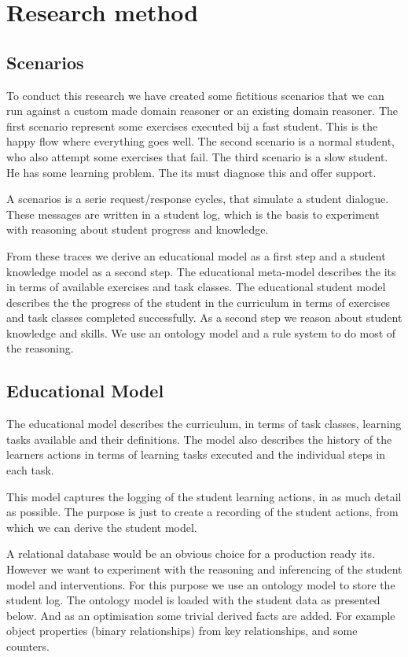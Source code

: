 \chapter{Research method}

\section{Scenarios}


To conduct this research we have created some fictitious scenarios that we can run against a custom made domain reasoner or an existing domain reasoner.
The first scenario represent some exercises executed bij a fast student. 
This is the happy flow where everything goes well.
The second scenario is a normal student, who also attempt some exercises that fail.
The third scenario is a slow student. 
He has some learning problem. 
The \gls{its} must diagnose this and offer support. 


A scenarios is a serie request/response cycles, that simulate a student dialogue.
These messages are written in a student log, which is the basis to experiment with reasoning about student progress and knowledge.

From these traces we derive an educational model as a first step and a student knowledge model as a second step.
The educational meta-model describes the \gls{its} in terms of available exercises and task classes.
The educational student model describes the the progress of the student in the curriculum in terms of exercises and task classes completed successfully.
As a second step we reason about student knowledge and skills.
We use an ontology model and a rule system to do most of the reasoning.


\section{Educational Model}

The educational model describes the curriculum, in terms of task classes,  learning tasks available and their definitions.
The model also describes the history of the learners actions in terms of learning tasks executed and the individual steps in each task.

This model captures the logging of the student learning actions, in as much detail as possible.
The purpose is just to create a recording of the student actions, from which we can derive the student model.

A relational database would be an obvious choice for a production ready \gls{its}.
However we want to experiment with the reasoning and inferencing of the student model and interventions.
For this purpose we use an ontology model to store the student log.
The ontology model is loaded with the student data as presented below.
And as an optimisation some trivial derived facts are added.
For example object properties (binary relationships) from key relationships, and some counters.





